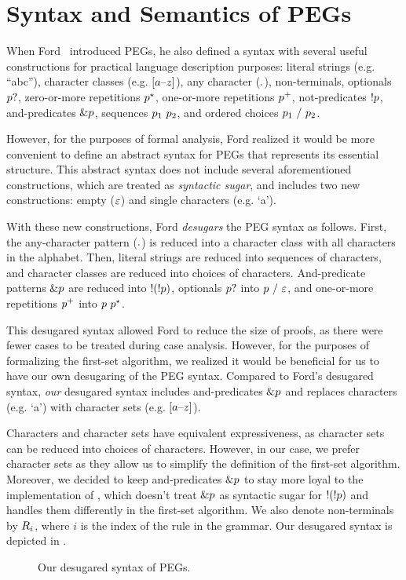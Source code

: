 \chapter{Syntax and Semantics of PEGs}
\label{chapter:pegs}

When Ford~\cite{ford_parsing_2004} introduced PEGs,
he also defined a syntax
with several useful constructions
for practical language description purposes:
literal strings (e.g. ``abc''),
character classes (e.g. $[a\text{--}z]$), any character ($.{}$),
non-terminals,
optionals $p?$, zero-or-more repetitions $p^\star$,
one-or-more repetitions $p^+$, not-predicates $!p$,
and-predicates $\&p$, sequences $p_1\ p_2$,
and ordered choices $p_1\ /\ p_2$.

However, for the purposes of formal analysis,
Ford realized it would be more
convenient to define an abstract syntax for PEGs
that represents its essential structure.
This abstract syntax does not include
several aforementioned constructions,
which are treated as \emph{syntactic sugar},
and includes two new constructions:
empty ($\varepsilon$) and single characters (e.g. `a').

With these new constructions,
Ford \emph{desugars} the PEG syntax as follows.
First, the any-character pattern ($.{}$) is reduced
into a character class with all characters in the alphabet.
Then, literal strings are reduced into sequences of characters,
and character classes are reduced into choices of characters.
And-predicate patterns $\&p$ are reduced into $!(!p)$,
optionals $p?$ into $p\ /\ \varepsilon$,
and one-or-more repetitions $p^+$ into $p\ p^\star$.

This desugared syntax allowed Ford to reduce the size of proofs,
as there were fewer cases to be treated during case analysis.
However, for the purposes of formalizing the first-set algorithm,
we realized it would be beneficial for us to have our own
desugaring of the PEG syntax.
Compared to Ford's desugared syntax,
\emph{our} desugared syntax
includes and-predicates $\&p$
and replaces characters (e.g. `a')
with character sets (e.g. $[a\text{--}z]$).

Characters and character sets
have equivalent expressiveness,
as character sets can be reduced into choices of characters.
However, in our case, we prefer character sets as they allow us to
simplify the definition of the first-set algorithm.
Moreover, we decided to keep and-predicates $\&p$
to stay more loyal to the implementation of \lpeg{},
which doesn't treat $\&p$ as syntactic sugar for $!(!p)$
and handles them differently in the first-set algorithm.
We also denote non-terminals by $R_{i}$,
where $i$ is the index of the rule in the grammar.
Our desugared syntax is depicted in .
\begin{figure}[t]
    \centering
    
    \caption{Our desugared syntax of PEGs.}
    \label{fig:syntax}
\end{figure}

